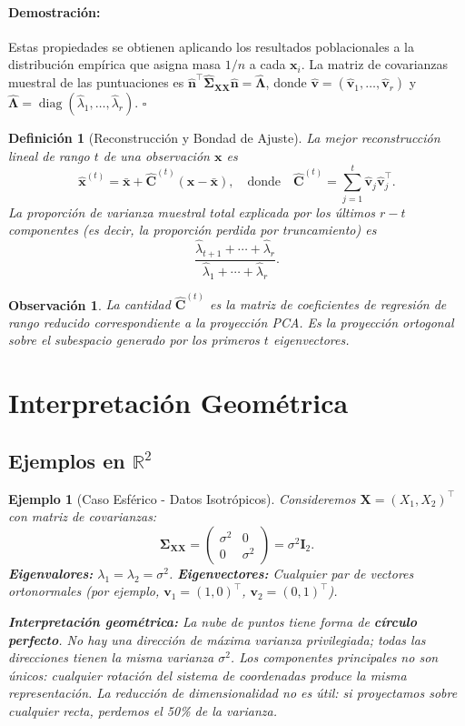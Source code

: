 \documentclass[11pt]{article}
\theoremstyle{plain}
\newtheorem{definition}[theorem]{Definición}
\newtheorem{remark}[theorem]{Observación}
\newtheorem{example}[theorem]{Ejemplo}
\newenvironment{proof}{\paragraph{Demostración:}}{\hfill$\square$}
\newcommand{\X}{\mathbf{X}}
\newcommand{\bfv}{\mathbf{v}}
\newcommand{\bfn}{\mathbf{n}}
\newcommand{\bfx}{\mathbf{x}}
\newcommand{\bfC}{\mathbf{C}}
\newcommand{\bfSigma}{\boldsymbol{\Sigma}}
\newcommand{\bfLambda}{\boldsymbol{\Lambda}}
\newcommand{\R}{\mathbb{R}}
\newcommand{\R}{\mathbb{R}}
\begin{document}
\begin{proof}
Estas propiedades se obtienen aplicando los resultados poblacionales a la distribución empírica que asigna masa \(1/n\) a cada \(\bfx_i\). La matriz de covarianzas muestral de las puntuaciones es \(\hat{\bfn}^\top \hat{\bfSigma}_{\X\X} \hat{\bfn} = \hat{\bfLambda}\), donde \(\hat{\bfv} = (\hat{\bfv}_1, \dots, \hat{\bfv}_r)\) y \(\hat{\bfLambda} = \operatorname{diag}(\hat{\lambda}_1, \dots, \hat{\lambda}_r)\).
\end{proof}

\begin{definition}[Reconstrucción y Bondad de Ajuste]
La mejor reconstrucción lineal de rango \(t\) de una observación \(\bfx\) es
\[
\hat{\bfx}^{(t)} = \bar{\bfx} + \hat{\bfC}^{(t)} (\bfx - \bar{\bfx}), \quad \text{donde} \quad \hat{\bfC}^{(t)} = \sum_{j=1}^t \hat{\bfv}_j \hat{\bfv}_j^\top.
\]
La proporción de varianza muestral total explicada por los últimos \(r-t\) componentes (es decir, la proporción perdida por truncamiento) es
\[
\frac{\hat{\lambda}_{t+1} + \cdots + \hat{\lambda}_r}{\hat{\lambda}_1 + \cdots + \hat{\lambda}_r}.
\]
\end{definition}

\begin{remark}
La cantidad \(\hat{\bfC}^{(t)}\) es la matriz de coeficientes de regresión de rango reducido correspondiente a la proyección PCA. Es la proyección ortogonal sobre el subespacio generado por los primeros \(t\) eigenvectores.
\end{remark}

\section{Interpretación Geométrica}

\subsection{Ejemplos en \(\R^2\)}

\begin{example}[Caso Esférico - Datos Isotrópicos]
\label{ej:esferico}
Consideremos \(\X = (X_1, X_2)^\top\) con matriz de covarianzas:
\[
\bfSigma_{\X\X} = \begin{pmatrix} \sigma^2 & 0 \\ 0 & \sigma^2 \end{pmatrix} = \sigma^2 \mathbf{I}_2.
\]
\textbf{Eigenvalores:} \(\lambda_1 = \lambda_2 = \sigma^2\). \textbf{Eigenvectores:} Cualquier par de vectores ortonormales (por ejemplo, \(\mathbf{v}_1 = (1,0)^\top\), \(\mathbf{v}_2 = (0,1)^\top\)).

\textbf{Interpretación geométrica:} La nube de puntos tiene forma de \textbf{círculo perfecto}. No hay una dirección de máxima varianza privilegiada; todas las direcciones tienen la misma varianza \(\sigma^2\). Los componentes principales no son únicos: cualquier rotación del sistema de coordenadas produce la misma representación. La reducción de dimensionalidad no es útil: si proyectamos sobre cualquier recta, perdemos el 50\% de la varianza.
\end{example}
\end{document}
